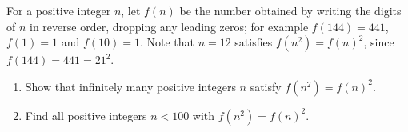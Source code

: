 For a positive integer $n$, let $f(n)$ be the number obtained by writing the digits of $n$ in reverse order, dropping any leading zeros; for example $f(144)=441$, $f(1)=1$ and $f(10)=1$. Note that $n=12$ satisfies $f\left(n^2\right)=f(n)^2$, since $f(144)=441=21^2$.
\begin{enumerate}
\item[(a)] Show that infinitely many positive integers $n$ satisfy $f\left(n^2\right)=f(n)^2$.
\item[(b)] Find all positive integers $n<100$ with $f\left(n^2\right)=f(n)^2$.
\end{enumerate}
